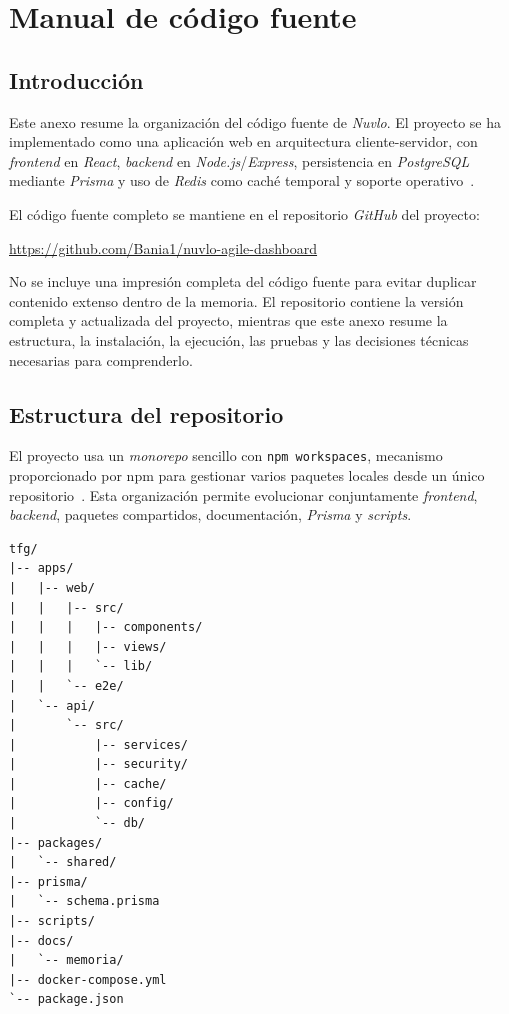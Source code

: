 \chapter{Manual de código fuente}\label{manual-codigo}
\begin{refsection}

\section{Introducción}

Este anexo resume la organización del código fuente de \textit{Nuvlo}. El proyecto se ha implementado como una aplicación web en arquitectura cliente-servidor, con \textit{frontend} en \textit{React}, \textit{backend} en \textit{Node.js}/\textit{Express}, persistencia en \textit{PostgreSQL} mediante \textit{Prisma} y uso de \textit{Redis} como caché temporal y soporte operativo~\cite{ReactDocs,NodeDocs,ExpressDocs,PrismaDocs,PostgreSQLDocs,RedisDocs}.

El código fuente completo se mantiene en el repositorio \textit{GitHub} del proyecto:

\begin{center}
\url{https://github.com/Bania1/nuvlo-agile-dashboard}
\end{center}

No se incluye una impresión completa del código fuente para evitar duplicar contenido extenso dentro de la memoria. El repositorio contiene la versión completa y actualizada del proyecto, mientras que este anexo resume la estructura, la instalación, la ejecución, las pruebas y las decisiones técnicas necesarias para comprenderlo.

\section{Estructura del repositorio}

El proyecto usa un \textit{monorepo} sencillo con \texttt{npm workspaces}, mecanismo proporcionado por npm para gestionar varios paquetes locales desde un único repositorio~\cite{NpmWorkspaces}. Esta organización permite evolucionar conjuntamente \textit{frontend}, \textit{backend}, paquetes compartidos, documentación, \textit{Prisma} y \textit{scripts}.

\begin{lstlisting}[language={},basicstyle=\ttfamily\footnotesize]
tfg/
|-- apps/
|   |-- web/
|   |   |-- src/
|   |   |   |-- components/
|   |   |   |-- views/
|   |   |   `-- lib/
|   |   `-- e2e/
|   `-- api/
|       `-- src/
|           |-- services/
|           |-- security/
|           |-- cache/
|           |-- config/
|           `-- db/
|-- packages/
|   `-- shared/
|-- prisma/
|   `-- schema.prisma
|-- scripts/
|-- docs/
|   `-- memoria/
|-- docker-compose.yml
`-- package.json
\end{lstlisting}


\end{refsection}
